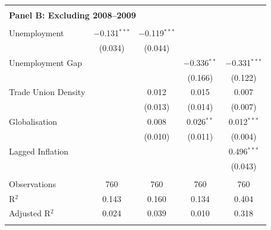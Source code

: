 \documentclass[preprint,10pt,authoryear]{elsarticle}
\begin{document}
\begin{table}[H]
\begin{minipage}[t]{0.48\textwidth}
{\begin{tabular}{lcccc}
\hline\\[-1.8ex]
\multicolumn{5}{l}{\textbf{Panel B: Excluding 2008--2009}} \\
\hline\\[-1.8ex]
Unemployment        & $-$0.131$^{***}$ & $-$0.119$^{***}$ &                  &                  \\
                    & (0.034)          & (0.044)          &                  &                  \\
Unemployment Gap    &                  &                  & $-$0.336$^{**}$  & $-$0.331$^{***}$ \\
                    &                  &                  & (0.166)          & (0.122)          \\
Trade Union Density &                  & 0.012            & 0.015            & 0.007            \\
                    &                  & (0.013)          & (0.014)          & (0.007)          \\
Globalisation       &                  & 0.008            & 0.026$^{**}$     & 0.012$^{***}$    \\
                    &                  & (0.010)          & (0.011)          & (0.004)          \\
Lagged Inflation    &                  &                  &                  & 0.496$^{***}$    \\
                    &                  &                  &                  & (0.043)          \\
\hline\\[-1.8ex]
Observations     & 760      & 760      & 760      & 760      \\
R$^{2}$          & 0.143    & 0.160    & 0.134    & 0.404    \\
Adjusted R$^{2}$ & 0.024    & 0.039    & 0.010    & 0.318    \\
\hline\hline\\[-1.8ex]
\end{tabular}}
\end{minipage}
\hfill
\begin{minipage}[t]{0.48\textwidth}
\centering
{}
\end{minipage}
\end{table}
\end{document}

